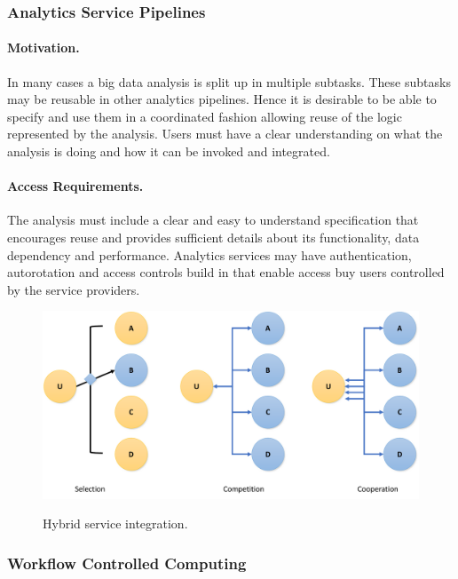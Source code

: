 
\subsubsection{Analytics Service Pipelines}

\paragraph{Motivation.}
In many cases a big data analysis is split up in multiple
subtasks. These subtasks may be reusable in other analytics
pipelines. Hence it is desirable to be able to specify and use them in
a coordinated fashion allowing reuse of the logic represented by the
analysis. Users must have a clear understanding on what the analysis
is doing and how it can be invoked and integrated.

\paragraph{Access Requirements.}
The analysis must include a clear and easy to understand specification
that encourages reuse and provides sufficient details about its
functionality, data dependency and performance. Analytics services may
have authentication, autorotation and access controls build in that
enable access buy users controlled by the service providers.



\begin{figure}[htb]
\centering\includegraphics[width=1.0\columnwidth]{images/NIST-AI-services-workflow.pdf}
\label{fig:hvac-2}
\caption{Hybrid service integration.}
\end{figure}


\subsubsection{Workflow Controlled Computing}

